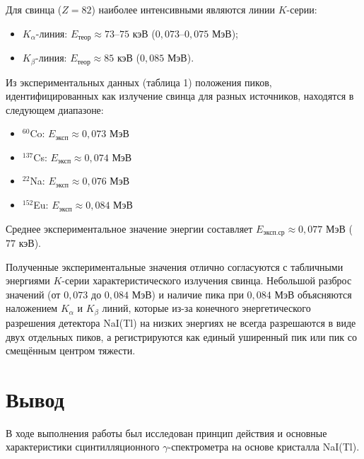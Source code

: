 \documentclass[12pt,a4paper]{article}
\begin{document}
Для свинца ($Z=82$) наиболее интенсивными являются линии $K$-серии:
\begin{itemize}
    \item $K_\alpha$-линия: $E_{\text{теор}} \approx 73\text{--}75$ кэВ ($0,073\text{--}0,075$ МэВ);
    \item $K_\beta$-линия: $E_{\text{теор}} \approx 85$ кэВ ($0,085$ МэВ).
\end{itemize}

Из экспериментальных данных (таблица 1) положения пиков, идентифицированных как излучение свинца для разных источников, находятся в следующем диапазоне:
\begin{itemize}
    \item $^{60}$Co: $E_{\text{эксп}} \approx 0,073$ МэВ
    \item $^{137}$Cs: $E_{\text{эксп}} \approx 0,074$ МэВ
    \item $^{22}$Na: $E_{\text{эксп}} \approx 0,076$ МэВ
    \item $^{152}$Eu: $E_{\text{эксп}} \approx 0,084$ МэВ
\end{itemize}

Среднее экспериментальное значение энергии составляет $E_{\text{эксп.ср}} \approx 0,077$ МэВ ($77$ кэВ). 

Полученные экспериментальные значения отлично согласуются с табличными энергиями $K$-серии характеристического излучения свинца. Небольшой разброс значений (от $0,073$ до $0,084$ МэВ) и наличие пика при $0,084$ МэВ объясняются наложением $K_\alpha$ и $K_\beta$ линий, которые из-за конечного энергетического разрешения детектора NaI(Tl) на низких энергиях не всегда разрешаются в виде двух отдельных пиков, а регистрируются как единый уширенный пик или пик со смещённым центром тяжести.

\section*{Вывод}

В ходе выполнения работы был исследован принцип действия и основные характеристики сцинтилляционного $\gamma$-спектрометра на основе кристалла NaI(Tl). 
\end{document}
